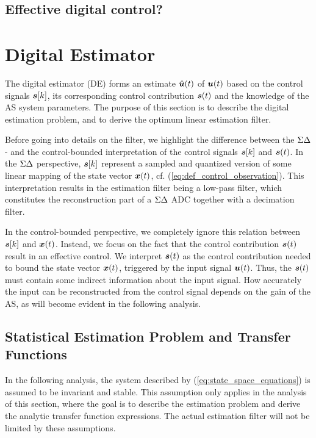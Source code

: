 \subsection{Effective digital control?}

\section{Digital Estimator}
The digital estimator (DE) forms an estimate $\hat{\bm{u}}(t)$ of $\bm{u}(t)$ based on the control signals $\bm{s}[k]$, its corresponding control contribution $\bm{s}(t)$ and the knowledge of the AS system parameters. The purpose of this section is to describe the digital estimation problem, and to derive the optimum linear estimation filter.

Before going into details on the filter, we highlight the difference between the $\Sigma\Delta$- and the control-bounded interpretation of the control signals $\bm{s}[k]$ and $\bm{s}(t)$. In the $\Sigma\Delta$ perspective, $\bm{s}[k]$ represent a sampled and quantized version of some linear mapping of the state vector $\bm{x}(t)$, cf. (\ref{eq:def_control_observation}). This interpretation results in the estimation filter being a low-pass filter, which constitutes the reconstruction part of a $\Sigma\Delta$ ADC together with a decimation filter.

In the control-bounded perspective, we completely ignore this relation between $\bm{s}[k]$ and $\bm{x}(t)$. Instead, we focus on the fact that the control contribution $\bm{s}(t)$ result in an effective control. We interpret $\bm{s}(t)$ as the control contribution needed to bound the state vector $\bm{x}(t)$, triggered by the input signal $\bm{u}(t)$. Thus, the $\bm{s}(t)$ must contain some indirect information about the input signal. How accurately the input can be reconstructed from the control signal depends on the gain of the AS, as will become evident in the following analysis.

\subsection{Statistical Estimation Problem and Transfer Functions}
In the following analysis, the system described by (\ref{eq:state_space_equations}) is assumed to be invariant and stable. This assumption only applies in the analysis of this section, where the goal is to describe the estimation problem and derive the analytic transfer function expressions. The actual estimation filter will not be limited by these assumptions.


